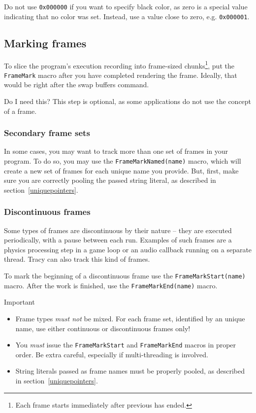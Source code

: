 \documentclass[hidelinks,titlepage,a4paper,twoside]{article}
\begin{document}
Do not use \texttt{0x000000} if you want to specify black color, as zero is a special value indicating that no color was set. Instead, use a value close to zero, e.g. \texttt{0x000001}.

\subsection{Marking frames}
\label{markingframes}

To slice the program's execution recording into frame-sized chunks\footnote{Each frame starts immediately after previous has ended.}, put the \texttt{FrameMark} macro after you have completed rendering the frame. Ideally, that would be right after the swap buffers command.

\begin{bclogo}[
noborder=true,
couleur=black!5,
logo=\bclampe
]{Do I need this?}
This step is optional, as some applications do not use the concept of a frame.
\end{bclogo}

\subsubsection{Secondary frame sets}
\label{secondaryframeset}

In some cases, you may want to track more than one set of frames in your program. To do so, you may use the \texttt{FrameMarkNamed(name)} macro, which will create a new set of frames for each unique name you provide. But, first, make sure you are correctly pooling the passed string literal, as described in section~\ref{uniquepointers}.

\subsubsection{Discontinuous frames}

Some types of frames are discontinuous by their nature -- they are executed periodically, with a pause between each run. Examples of such frames are a physics processing step in a game loop or an audio callback running on a separate thread. Tracy can also track this kind of frames.

To mark the beginning of a discontinuous frame use the \texttt{FrameMarkStart(name)} macro. After the work is finished, use the \texttt{FrameMarkEnd(name)} macro.

\begin{bclogo}[
noborder=true,
couleur=black!5,
logo=\bcbombe
]{Important}
\begin{itemize}
\item Frame types \emph{must not} be mixed. For each frame set, identified by an unique name, use either continuous or discontinuous frames only!
\item You \emph{must} issue the \texttt{FrameMarkStart} and \texttt{FrameMarkEnd} macros in proper order. Be extra careful, especially if multi-threading is involved.
\item String literals passed as frame names must be properly pooled, as described in section~\ref{uniquepointers}.
\end{itemize}
\end{bclogo}
\end{document}
